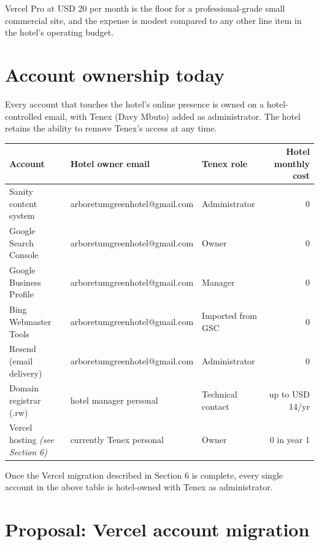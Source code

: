 \documentclass[11pt,a4paper]{article}
\begin{document}
Vercel Pro at USD 20 per month is the floor for a professional-grade small commercial site, and the expense is modest compared to any other line item in the hotel's operating budget.

\section{Account ownership today}

Every account that touches the hotel's online presence is owned on a hotel-controlled email, with Tenex (Davy Mbuto) added as administrator. The hotel retains the ability to remove Tenex's access at any time.

\begin{tabularx}{\textwidth}{@{} X X X r @{}}
\toprule
\textbf{Account} & \textbf{Hotel owner email} & \textbf{Tenex role} & \textbf{Hotel monthly cost} \\
\midrule
Sanity content system & arboretumgreenhotel@\allowbreak gmail.\allowbreak com & Administrator & 0 \\
Google Search Console & arboretumgreenhotel@\allowbreak gmail.\allowbreak com & Owner & 0 \\
Google Business Profile & arboretumgreenhotel@\allowbreak gmail.\allowbreak com & Manager & 0 \\
Bing Webmaster Tools & arboretumgreenhotel@\allowbreak gmail.\allowbreak com & Imported from GSC & 0 \\
Resend (email delivery) & arboretumgreenhotel@\allowbreak gmail.\allowbreak com & Administrator & 0 \\
Domain registrar (.rw) & hotel manager personal & Technical contact & up to USD 14/yr \\
Vercel hosting \emph{(see Section 6)} & currently Tenex personal & Owner & 0 in year 1 \\
\bottomrule
\end{tabularx}

Once the Vercel migration described in Section 6 is complete, every single account in the above table is hotel-owned with Tenex as administrator.

\section{Proposal: Vercel account migration}
\end{document}
